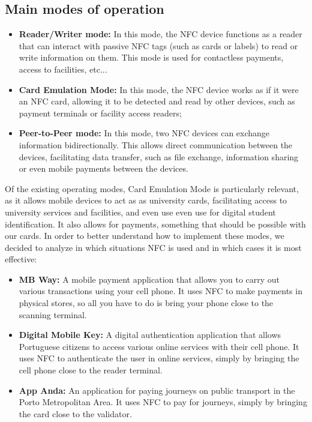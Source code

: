 \documentclass{article}
\begin{document}
\subsection{Main modes of operation}
\begin{itemize}
    \item \textbf{Reader/Writer mode: } In this mode, the NFC device functions as a reader that can interact with passive NFC tags (such as cards or labels) to read or write information on them. This mode is used for contactless payments, access to facilities, etc...
    \item \textbf{Card Emulation Mode: } In this mode, the NFC device works as if it were an NFC card, allowing it to be detected and read by other devices, such as payment terminals or facility access readers;
    \item \textbf{Peer-to-Peer mode: } In this mode, two NFC devices can exchange information bidirectionally. This allows direct communication between the devices, facilitating data transfer, such as file exchange, information sharing or even mobile payments between the devices.
\end{itemize}

Of the existing operating modes, Card Emulation Mode is particularly relevant, as it allows mobile devices to act as
as university cards, facilitating access to university services and facilities, and even use
even use for digital student identification. It also allows for payments, something that should be possible with our cards.
In order to better understand how to implement these modes, we decided to analyze in which situations NFC is used and in which cases it is most effective:

\begin{itemize}
    \item \textbf{MB Way:} A mobile payment application that allows you to carry out various transactions using your cell phone. It uses NFC to make payments in physical stores, so all you have to do is bring your phone close to the scanning terminal.
    \item \textbf{Digital Mobile Key:} A digital authentication application that allows Portuguese citizens to access various online services with their cell phone. It uses NFC to authenticate the user in online services, simply by bringing the cell phone close to the reader terminal.
    \item \textbf{App Anda:} An application for paying journeys on public transport in the Porto Metropolitan Area. It uses NFC to pay for journeys, simply by bringing the card close to the validator.
\end{itemize}
\end{document}

